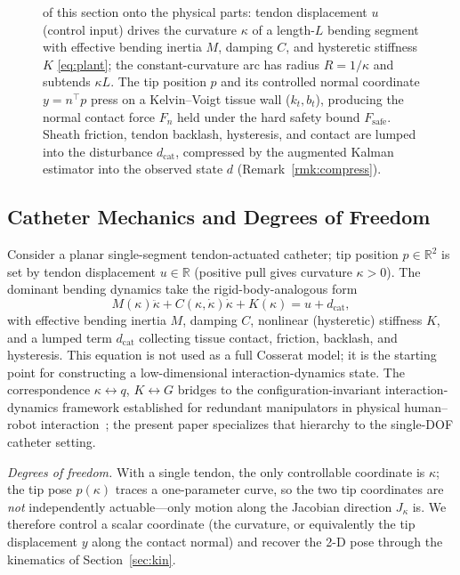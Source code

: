 \begin{figure}[t]
{of this section onto the physical parts: tendon displacement $u$ (control
input) drives the curvature $\kappa$ of a length-$L$ bending segment with
effective bending inertia $M$, damping $C$, and hysteretic stiffness $K$
\eqref{eq:plant}; the constant-curvature arc has radius $R=1/\kappa$ and
subtends $\kappa L$. The tip position $p$ and its controlled normal coordinate
$y=n^\top p$ press on a Kelvin--Voigt tissue wall ($k_t,b_t$), producing the
normal contact force $F_n$ held under the hard safety bound $F_\text{safe}$.
Sheath friction, tendon backlash, hysteresis, and contact are lumped into the
disturbance $d_\text{cat}$, compressed by the augmented Kalman estimator into
the observed state $d$ (Remark~\ref{rmk:compress}).}
\label{fig:plant}
\end{figure}

\subsection{Catheter Mechanics and Degrees of Freedom}

Consider a planar single-segment tendon-actuated catheter; tip position $p \in \mathbb{R}^2$ is set by tendon displacement $u \in \mathbb{R}$ (positive pull gives curvature $\kappa > 0$). The dominant bending dynamics take the rigid-body-analogous form
\begin{equation}
M(\kappa)\ddot{\kappa} + C(\kappa,\dot\kappa)\dot{\kappa} + K(\kappa) = u + d_{\text{cat}},
\label{eq:plant}
\end{equation}
with effective bending inertia $M$, damping $C$, nonlinear (hysteretic) stiffness $K$, and a lumped term $d_{\text{cat}}$ collecting tissue contact, friction, backlash, and hysteresis. This equation is not used as a full Cosserat model; it is the starting point for constructing a low-dimensional interaction-dynamics state. The correspondence $\kappa\leftrightarrow q$, $K\leftrightarrow G$ bridges to the configuration-invariant interaction-dynamics framework established for redundant manipulators in physical human--robot interaction~\cite{cao2026phri}; the present paper specializes that hierarchy to the single-DOF catheter setting.

\emph{Degrees of freedom.} With a single tendon, the only controllable coordinate is $\kappa$; the tip pose $p(\kappa)$ traces a one-parameter curve, so the two tip coordinates are \emph{not} independently actuable---only motion along the Jacobian direction $J_\kappa$ is. We therefore control a scalar coordinate (the curvature, or equivalently the tip displacement $y$ along the contact normal) and recover the 2-D pose through the kinematics of Section~\ref{sec:kin}.

